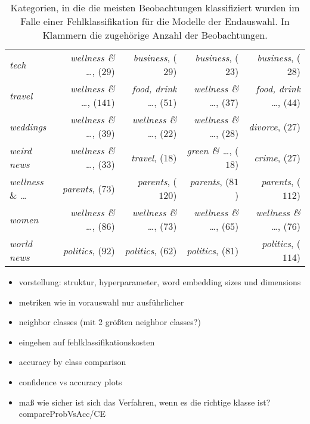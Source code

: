 \documentclass[a4paper,11pt]{article}
\begin{document}
\begin{table}[ht]
\begin{tabular}{|l||rrrr|}
  \textit{tech} & \textit{wellness \& \dots}, ($29$) & \textit{business}, ($29$) & \textit{business}, ($23$) & \textit{business}, ($28$) \\ 
  \textit{travel} & \textit{wellness \& \dots}, ($141$) & \textit{food, drink \dots}, ($51$) & \textit{wellness \& \dots}, ($37$) & \textit{food, \textit{drink} \dots}, ($44$) \\ 
  \textit{weddings} & \textit{wellness \& \dots}, ($39$) & \textit{wellness \& \dots}, ($22$) & \textit{wellness \& \dots}, ($28$) & \textit{divorce}, ($27$) \\ 
  \textit{weird news} & \textit{wellness \& \dots}, ($33$) & \textit{travel}, ($18$) & \textit{green \& \dots}, ($18$) & \textit{crime}, ($27$) \\ 
  \textit{wellness} \& \dots & \textit{parents}, ($73$) & \textit{parents}, ($120$) & \textit{parents}, ($81$) & \textit{parents}, ($112$) \\ 
  \textit{women} & \textit{wellness \& \dots}, ($86$) & \textit{wellness \& \dots}, ($73$) & \textit{wellness \& \dots}, ($65$) & \textit{wellness \& \dots}, ($76$) \\ 
  \textit{world news} & \textit{politics}, ($92$) & \textit{politics}, ($62$) & \textit{politics}, ($81$) & \textit{politics}, ($114$) \\ 
   \hline
\end{tabular}
\caption{Kategorien, in die die meisten Beobachtungen klassifiziert wurden im Falle einer Fehlklassifikation für die Modelle der Endauswahl. In Klammern die zugehörige Anzahl der Beobachtungen.}
\label{tab:neighborClasses}
\end{table}





\begin{itemize}
\item vorstellung: struktur, hyperparameter, word embedding sizes und dimensions
    \item metriken wie in vorauswahl nur ausführlicher
    \item neighbor classes (mit 2 größten neighbor classes?)
    \item eingehen auf fehlklassifikationskosten
    \item accuracy by class comparison
    \item confidence vs accuracy plots
    \item maß wie sicher ist sich das Verfahren, wenn es die richtige klasse ist? compareProbVsAcc/CE
\end{itemize}{}
\end{document}
